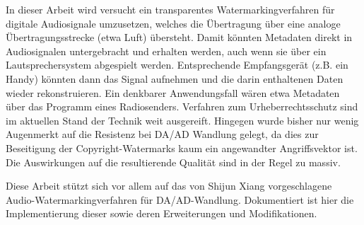 In dieser Arbeit wird versucht ein transparentes Watermarkingverfahren für digitale Audiosignale umzusetzen, welches die Übertragung über eine analoge Übertragungsstrecke (etwa Luft) übersteht. Damit könnten Metadaten direkt in Audiosignalen untergebracht und erhalten werden, auch wenn sie über ein Lautsprechersystem abgespielt werden. Entsprechende Empfangsgerät (z.B. ein Handy) könnten dann das Signal aufnehmen und die darin enthaltenen Daten wieder rekonstruieren. Ein denkbarer Anwendungsfall wären etwa Metadaten über das Programm eines Radiosenders. Verfahren zum Urheberrechtsschutz sind im aktuellen Stand der Technik weit ausgereift. Hingegen wurde bisher nur wenig Augenmerkt auf die Resistenz bei DA/AD Wandlung gelegt, da dies zur Beseitigung der Copyright-Watermarks kaum ein angewandter Angriffsvektor ist. Die Auswirkungen auf die resultierende Qualität sind in der Regel zu massiv. 

Diese Arbeit stützt sich vor allem auf das von Shijun Xiang\cite{xiang2007robust} vorgeschlagene Audio-Watermarkingverfahren für DA/AD-Wandlung. Dokumentiert ist hier die Implementierung dieser sowie deren Erweiterungen und Modifikationen. 


